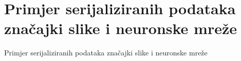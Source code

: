 \chapter{Primjer serijaliziranih podataka značajki slike i neuronske mreže}
\label{ch:primjer-serijaliziranih-podataka-znacajki-slike-i-neuronske-mreze}
Primjer serijaliziranih podataka značajki slike i neuronske mreže %
